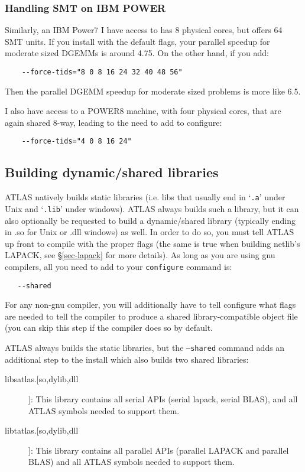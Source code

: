\documentclass[11pt]{article}
\begin{document}
\subsubsection{Handling SMT on IBM POWER}
Similarly, an IBM Power7 I have access to has 8 physical cores, but offers
64 SMT units.  If you install with the default flags, your parallel speedup
for moderate sized DGEMMs is around 4.75.  On the other hand, if you add:
\begin{verbatim}
    --force-tids="8 0 8 16 24 32 40 48 56"
\end{verbatim}
Then the parallel DGEMM speedup for moderate sized problems is more like 6.5.

I also have access to a POWER8 machine, with four physical cores, that are
again shared 8-way, leading to the need to add to configure:
\begin{verbatim}
    --force-tids="4 0 8 16 24"
\end{verbatim}

\clearpage
\subsection{Building dynamic/shared libraries}
\label{sec-shared}
ATLAS natively builds static libraries (i.e. libs that usually end in
`\texttt{.a}' under Unix and `\texttt{.lib}' under windows).  
ATLAS always builds such a library,
but it can also optionally be requested to build a dynamic/shared library
(typically ending in .so for Unix or .dll windows) as well.  In order to do so,
you must tell ATLAS up front to compile with the proper flags (the same is
true when building netlib's LAPACK, see \S\ref{sec-lapack} for more details).  
As long as you are using gnu compilers, all you need to add to your 
{\tt configure} command is:
\vspace*{-0.1in}
\begin{verbatim}
   --shared
\end{verbatim}

For any non-gnu compiler, you will additionally have to tell configure what
flags are
needed to tell the compiler to produce a shared library-compatible object
file (you can skip this step if the compiler does so by default.

ATLAS always builds the static libraries, but the {\tt --shared} command
adds an additional step to the install which also builds two shared libraries:
\begin{description}
\item [libsatlas.[so,dylib,dll]]: This library contains all serial APIs
      (serial lapack, serial BLAS), 
      and all ATLAS symbols needed to support them.
\item [libtatlas.[so,dylib,dll]]: This library contains all parallel
      APIs (parallel LAPACK and parallel BLAS) 
      and all ATLAS symbols needed to support them.
\end{description}
\end{document}

